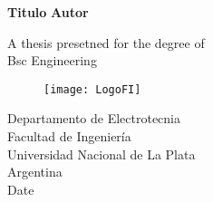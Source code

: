 \begin{titlepage}
\begin{center}
\vspace*{1cm}

\textbf{Titulo}
\vspace*{0.5cm}
\textbf{Autor}
\vfill

A thesis presetned for the degree of \\
Bsc Engineering

\space{0.8cm}

\begin{figure}
  \texttt{[image: LogoFI]}
\end{figure}
Departamento de Electrotecnia\\
Facultad de Ingeniería\\
Universidad Nacional de La Plata\\
Argentina\\
Date
\end{center}
\end{titlepage}
